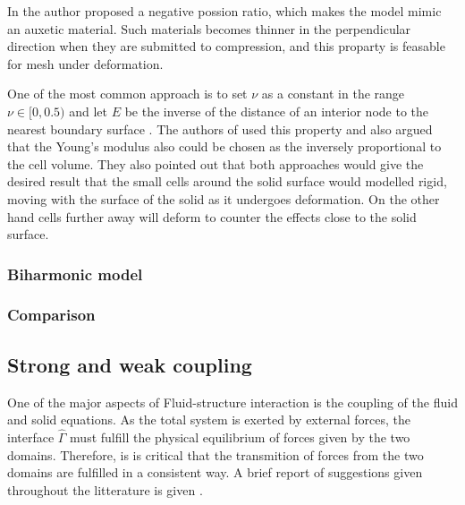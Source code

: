 In \cite{Wicka} the author proposed a negative possion ratio, which makes the model mimic an auxetic material. Such materials becomes thinner in the perpendicular direction when they are submitted to compression, and this proparty is feasable for mesh under deformation. 

One of the most common approach is to set $\nu$ as a constant in the range $\nu \in [0, 0.5)$ and let $E$ be the inverse of the distance of an interior node to the nearest boundary surface \cite{MM2016}. 
The authors of \cite{Biedron} used this property and also argued that the Young's modulus also could be chosen as the inversely proportional to the cell volume. They also pointed out that both approaches would give the desired result that the small cells around the solid surface would modelled rigid, moving with the surface of the solid as it undergoes deformation. On the other hand cells further away will deform to counter the effects close to the solid surface.

\subsubsection*{Biharmonic model}

\subsubsection*{Comparison}



\subsection*{Strong and weak coupling }
One of the major aspects of Fluid-structure interaction is the coupling of the fluid and solid equations.  As the total system is exerted by external forces, the interface $\hat{\Gamma}$ must fulfill the physical equilibrium of forces given by the two domains. Therefore, is is critical that the transmition of forces from the two domains are fulfilled in a consistent way. A brief report of suggestions given throughout the litterature is given \cite{MM2016}.

